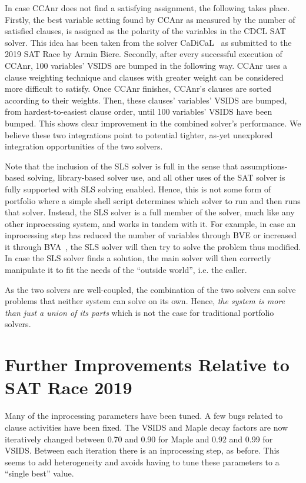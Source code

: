 \documentclass[final]{ieee}
\begin{document}
In case CCAnr does not find a satisfying assignment, the following takes place. Firstly, the best variable setting found by CCAnr as measured by the number of satisfied clauses, is assigned as the polarity of the variables in the CDCL SAT solver. This idea has been taken from the solver CaDiCaL~\cite{cadical} as submitted to the 2019 SAT Race by Armin Biere.
%
Secondly, after every successful execution of CCAnr, 100 variables' VSIDS are bumped in the following way. CCAnr uses a clause weighting technique and clauses with greater weight can be considered more difficult to satisfy. Once CCAnr finishes, CCAnr's clauses are sorted according to their weights. Then, these clauses' variables' VSIDS are bumped, from hardest-to-easiest clause order, until 100 variables' VSIDS have been bumped.
% 
This shows clear improvement in the combined solver's performance. We believe these two integrations point to potential tighter, as-yet unexplored integration opportunities of the two solvers.

Note that the inclusion of the SLS solver is full in the sense that assumptions-based solving, library-based solver use, and all other uses of the SAT solver is fully supported with SLS solving enabled. Hence, this is not some form of portfolio where a simple shell script determines which solver to run and then runs that solver. Instead, the SLS solver is a full member of the solver, much like any other inprocessing system, and works in tandem with it. For example, in case an inprocessing step has reduced the number of variables through BVE or increased it through BVA~\cite{BVA}, the SLS solver will then try to solve the problem thus modified. In case the SLS solver finds a solution, the main solver will then correctly manipulate it to fit the needs of the ``outside world'', i.e. the caller.

As the two solvers are well-coupled, the combination of the two solvers can solve problems that neither system can solve on its own. Hence, \emph{the system is more than just a union of its parts} which is not the case for traditional portfolio solvers.

\section{Further Improvements Relative to SAT Race 2019}
Many of the inprocessing parameters have been tuned. A few bugs related to clause activities have been fixed. The VSIDS and Maple decay factors are now iteratively changed between 0.70 and 0.90 for Maple and 0.92 and 0.99 for VSIDS. Between each iteration there is an inprocessing step, as before. This seems to add heterogeneity and avoids having to tune these parameters to a ``single best'' value.
\end{document}
